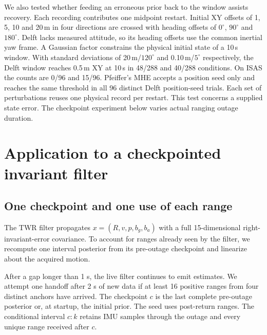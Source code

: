 \documentclass{IEEEtaes}
\begin{document}
We also tested whether feeding an erroneous prior back to the window assists recovery. Each recording contributes one midpoint restart. Initial XY offsets of 1, 5, 10 and 20\,m in four directions are crossed with heading offsets of $0^\circ$, $90^\circ$ and $180^\circ$. Delft lacks measured attitude, so its heading offsets use the common inertial yaw frame. A Gaussian factor constrains the physical initial state of a 10\,s window. With standard deviations of 20\,m/$120^\circ$ and 0.10\,m/$5^\circ$ respectively, the Delft window reaches 0.5\,m XY at 10\,s in 48/288 and 40/288 conditions. On ISAS the counts are 0/96 and 15/96. Pfeiffer's MHE accepts a position seed only and reaches the same threshold in all 96 distinct Delft position-seed trials. Each set of perturbations reuses one physical record per restart. This test concerns a supplied state error. The checkpoint experiment below varies actual ranging outage duration.

\section{Application to a checkpointed invariant filter}\label{sec:handoff}
\subsection{One checkpoint and one use of each range}
The TWR filter propagates \(x=(R,v,p,b_g,b_a)\) with a full 15-dimensional right-invariant-error covariance. To account for ranges already seen by the filter, we recompute one interval posterior from its pre-outage checkpoint and linearize about the acquired motion.

After a gap longer than 1 s, the live filter continues to emit estimates. We attempt one handoff after 2 s of new data if at least 16 positive ranges from four distinct anchors have arrived. The checkpoint \(c\) is the last complete pre-outage posterior or, at startup, the initial prior. The seed uses post-return ranges. The conditional interval \(c{:}k\) retains IMU samples through the outage and every unique range received after \(c\).
\end{document}
